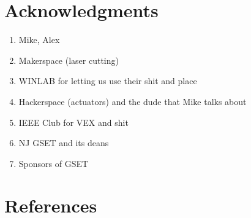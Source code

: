 \documentclass[11pt]{article}
\numberwithin{figure}{section}
\begin{document}
\begin{multicols}{2}
\section{Acknowledgments}
\begin{enumerate}
\item Mike, Alex
\item Makerspace (laser cutting)
\item WINLAB for letting us use their shit and place
\item Hackerspace (actuators) and the dude that Mike talks about
\item IEEE Club for VEX and shit
\item NJ GSET and its deans
\item Sponsors of GSET
\end{enumerate}
\section{References}
\end{multicols}
\end{document}
